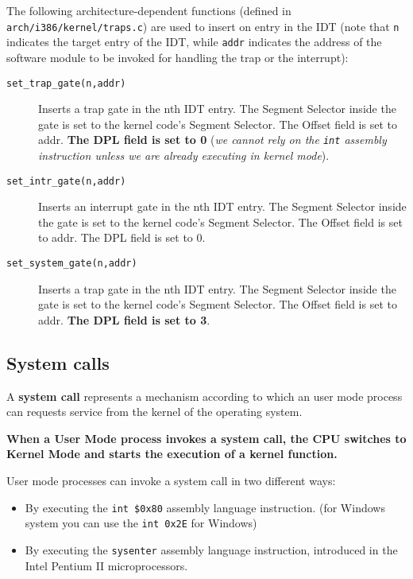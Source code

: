 \documentclass[10pt,a4paper]{article}
\begin{document}
The following architecture-dependent functions (defined in \texttt{arch/i386/kernel/traps.c}) are used to insert on entry in the IDT (note that \texttt{n} indicates the target entry of the IDT, while \texttt{addr} indicates the address of the software module to be invoked for handling the trap or the interrupt):
\begin{description} 
\item[\texttt{set\_trap\_gate(n,addr)}] Inserts a trap gate in the nth IDT entry. The Segment Selector inside the gate is set to the kernel code’s Segment Selector. The Offset field is set to addr. \textbf{The DPL field is set to 0} (\textit{we cannot rely on the \texttt{int} assembly instruction unless we are already executing in kernel mode}).
\item[\texttt{set\_intr\_gate(n,addr)}] Inserts an interrupt gate in the nth IDT entry. The Segment Selector inside the gate is set to the kernel code's Segment Selector. The Offset field is set to addr. The DPL field is set to 0.
\item[\texttt{set\_system\_gate(n,addr)}] Inserts a trap gate in the nth IDT entry. The Segment Selector inside the gate is set to the kernel code's Segment Selector. The Offset field is set to addr. \textbf{The DPL field is set to 3}.
\end{description}









\subsection{System calls}

A \textbf{system call} represents a mechanism according to which an user mode process can requests service from the kernel of the operating system.

\textbf{When a User Mode process invokes a system call, the CPU switches to Kernel Mode and starts the execution of a kernel function.}

User mode processes can invoke a system call in two different ways:
\begin{itemize}

\item By executing the \texttt{int \$0x80} assembly language instruction. (for Windows system you can use the \texttt{int 0x2E} for Windows)
\item By executing the \texttt{sysenter} assembly language instruction, introduced in the Intel Pentium II microprocessors.

\end{itemize}
\end{document}
